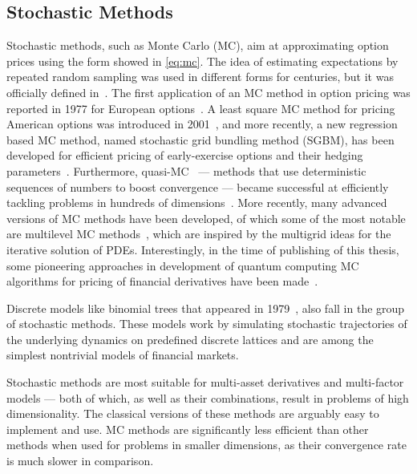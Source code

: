 \documentclass{UUThesisTemplate}
\begin{document}
%



%
\subsection{Stochastic Methods}

\par
Stochastic methods, such as Monte Carlo (MC), aim at approximating option prices using the form showed in \eqref{eq:mc}. The idea of estimating expectations by repeated random sampling was used in different forms for centuries, but it was officially defined in~\cite{metropolis1949monte}. The first application of an MC method in option pricing was reported in 1977 for European options~\cite{boyle1977options}. A least square MC method for pricing American options was introduced in 2001~\cite{longstaff2001valuing}, and more recently, a new regression based MC method, named stochastic grid bundling method (SGBM), has been developed for efficient pricing of early-exercise options and their hedging parameters~\cite{jain2015stochastic}. Furthermore, quasi-MC~\cite{paskov1995faster} --- methods that use deterministic sequences of numbers to boost convergence --- became successful at efficiently tackling problems in hundreds of dimensions~\cite{dick2013high}. More recently, many advanced versions of MC methods have been developed, of which some of the most notable are multilevel MC methods~\cite{giles2008multilevel}, which are inspired by the multigrid ideas for the iterative solution of PDEs. %
Interestingly, in the time of publishing of this thesis, some pioneering approaches in development of quantum computing MC algorithms for pricing of financial derivatives have been made~\cite{rebentrost2018quantum}.

\par
Discrete models like binomial trees that appeared in 1979~\cite{cox1979option, rendleman1979two}, also fall in the group of stochastic methods. These models work by simulating stochastic trajectories of the underlying dynamics on predefined discrete lattices and are among the simplest nontrivial models of financial markets. 

\par
Stochastic methods are most suitable for multi-asset derivatives and multi-factor models --- both of which, as well as their combinations, result in problems of high dimensionality. The classical versions of these methods are arguably easy to implement and use. MC methods are significantly less efficient than other methods when used for problems in smaller dimensions, as their convergence rate is much slower in comparison.
%
\end{document}
